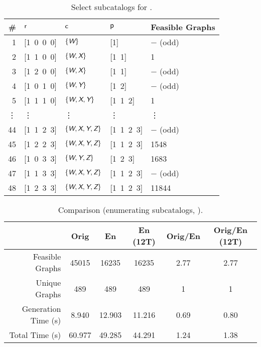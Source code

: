 \begin{table}[!ht]
\centering
\caption{Select subcatalogs for .\label{tb:app1:subcatalogs-ex2-1}}
\begin{tabular}{r | l | l | l | l}
\hline \hline
\# & $\textup{\textsf{r}}$ & $\textup{\textsf{c}}$ & $\textup{\textsf{p}}$ & Feasible Graphs \\
\hline
1 & [1\ 0\ 0\ 0] & $\{ \textsl{\textsf{W}} \}$ & [1] & $-$ (odd)  \\
2 & [1\ 1\ 0\ 0] & $\{ \textsl{\textsf{W}}, \textsl{\textsf{X}} \}$ & [1\ 1] & 1 \\
3 & [1\ 2\ 0\ 0] & $\{ \textsl{\textsf{W}}, \textsl{\textsf{X}} \}$ & [1\ 1] & $-$ (odd)  \\
4 & [1\ 0\ 1\ 0] & $\{ \textsl{\textsf{W}}, \textsl{\textsf{Y}}\}$ & [1\ 2] & $-$ (odd)  \\
5 & [1\ 1\ 1\ 0] & $\{ \textsl{\textsf{W}}, \textsl{\textsf{X}}, \textsl{\textsf{Y}}\}$ & [1\ 1\ 2] & 1 \\
\vdots & \vdots & \vdots & \vdots & \vdots \\
44 & [1\ 1\ 2\ 3] & $\{ \textsl{\textsf{W}}, \textsl{\textsf{X}}, \textsl{\textsf{Y}}, \textsl{\textsf{Z}}\}$ & [1\ 1\ 2\ 3] & $-$ (odd) \\
45 & [1\ 2\ 2\ 3] & $\{ \textsl{\textsf{W}}, \textsl{\textsf{X}}, \textsl{\textsf{Y}}, \textsl{\textsf{Z}}\}$ & [1\ 1\ 2\ 3] & 1548 \\
46 & [1\ 0\ 3\ 3] & $\{ \textsl{\textsf{W}}, \textsl{\textsf{Y}}, \textsl{\textsf{Z}}\}$ & [1\ 2\ 3] & 1683 \\
47 & [1\ 1\ 3\ 3] & $\{ \textsl{\textsf{W}}, \textsl{\textsf{X}}, \textsl{\textsf{Y}}, \textsl{\textsf{Z}}\}$ & [1\ 1\ 2\ 3] & $-$ (odd) \\
48 & [1\ 2\ 3\ 3] & $\{ \textsl{\textsf{W}}, \textsl{\textsf{X}}, \textsl{\textsf{Y}}, \textsl{\textsf{Z}}\}$ & [1\ 1\ 2\ 3] & 11844 \\
\hline \hline
\end{tabular}
\end{table}

\begin{table}[!ht]
\centering
\caption{Comparison (enumerating subcatalogs, ).\label{tb:app1:subcatalogs-ex2}}
\begin{tabular}{r | c | c | c | c | c}
\hline \hline
& Orig & En & En (12T) & Orig/En & Orig/En (12T) \\
\hline
Feasible Graphs & 45015 & 16235 & 16235 & 2.77 & 2.77 \\ 
Unique Graphs & 489 & 489 & 489 & 1 & 1 \\
Generation Time (s) & 8.940 & 12.903 & 11.216 & 0.69 & 0.80 \\
Total Time (s) & 60.977 & 49.285 & 44.291 & 1.24 & 1.38 \\
\hline \hline
\end{tabular}
\end{table}
